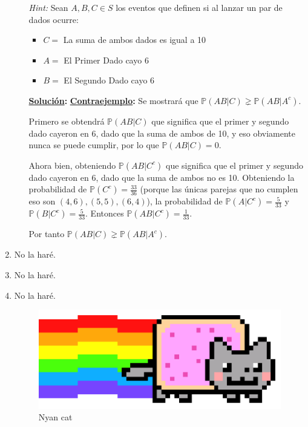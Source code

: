 \documentclass[11pt,letterpaper]{report}
\newcommand{\Pro}{\mathds{P}}
\newcommand{\sol}{\textbf{\underline{Solución}: }} %
\newcommand{\cej}{\textbf{\underline{Contraejemplo}: }}
\begin{document}
\begin{enumerate}
\begin{itemize}
    \textit{Hint:} Sean $A, B, C \in S$ los eventos que definen si al lanzar un par de dados ocurre:
    \begin{itemize}
        \item $C =$ {La suma de ambos dados es igual a 10}
        \item $A =$ {El Primer Dado cayo 6}
        \item $B =$ {El Segundo Dado cayo 6}
    \end{itemize}

    \sol \cej Se mostrará que $\Pro(AB|C) \gneq \Pro(AB|A^c)$.

    Primero se obtendrá $\Pro(AB|C)$ que significa que el primer y segundo dado cayeron en 6, dado
    que la suma de ambos de 10, y eso obviamente nunca se puede cumplir, por lo que $\Pro(AB|C) = 0$.

    Ahora bien, obteniendo $\Pro(AB|C^c)$ que significa que el primer y segundo dado cayeron en 6,
    dado que la suma de ambos no es 10. Obteniendo la probabilidad de $\Pro(C^c) = \frac{33}{36}$
    (porque las únicas parejas que no cumplen eso son $(4, 6),(5, 5),(6, 4)$),
    la probabilidad de $\Pro(A|C^c) = \frac{5}{33}$ y $\Pro(B|C^c) = \frac{5}{33}$. Entonces
    $\Pro(AB|C^c) = \frac{1}{33}$.

    Por tanto $\Pro(AB|C) \gneq \Pro(AB|A^c)$.
\end{itemize}

\item No la haré.

\item No la haré.

\item No la haré.


\begin{figure}[H]
    \centering
    \includegraphics[scale=0.25]{nyan.png}
    \caption{Nyan cat}
\end{figure}

\end{enumerate}



\end{document}
